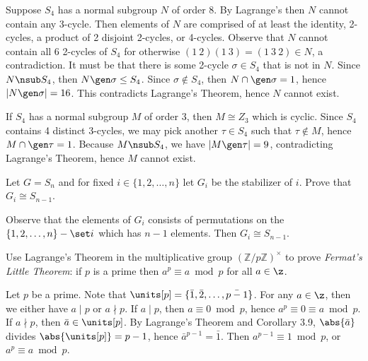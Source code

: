 \begin{sol}
    Suppose $S_4$ has a normal subgroup $N$ of order 8. By Lagrange's then $N$ cannot contain any 3-cycle. Then elements of $N$ are comprised of at least the identity, 2-cycles, a product of 2 disjoint 2-cycles, or 4-cycles. Observe that $N$ cannot contain all 6 2-cycles of $S_4$ for otherwise $(1\ 2)(1\ 3) = (1\ 3\ 2) \in N$, a contradiction. It must be that there is some 2-cycle $\sigma \in S_4$ that is not in $N$. Since $N \nsub S_4$, then $N \gen\sigma \leq S_4$. Since $\sigma \not\in S_4$, then $N \cap \gen\sigma = 1$, hence $|N \gen\sigma| = 16$. This contradicts Lagrange's Theorem, hence $N$ cannot exist.

    If $S_4$ has a normal subgroup $M$ of order 3, then $M \cong Z_3$ which is cyclic. Since $S_4$ contains 4 distinct 3-cycles, we may pick another $\tau \in S_4$ such that $\tau \not\in M$, hence $M \cap \gen\tau = 1$. Because $M \nsub S_4$, we have $|M \gen\tau| = 9$, contradicting Lagrange's Theorem, hence $M$ cannot exist.
\end{sol}

\begin{exercise}\label{ex3.2.15}
    Let $G = S_n$ and for fixed $i \in \{1, 2, \dots, n\}$ let $G_i$ be the stabilizer of $i$. Prove that $G_i \cong S_{n-1}$.
\end{exercise}

\begin{sol}
    Observe that the elements of $G_i$ consists of permutations on the $\{1, 2, \ldots, n\} - \set i$ which has $n - 1$ elements. Then $G_i \cong S_{n - 1}$.
\end{sol}

\begin{exercise}\label{ex3.2.16}
    Use Lagrange's Theorem in the multiplicative group $(\mathbb{Z}/p\mathbb{Z})^\times$ to prove \emph{Fermat's Little Theorem}: if $p$ is a prime then $a^p \equiv a \bmod p$ for all $a \in \z$.
\end{exercise}

\begin{sol}
    Let $p$ be a prime. Note that $\units[p] = \{\bar 1, \bar 2, \ldots, \bar{p - 1}\}$. For any $a \in \z$, then we either have $a \mid p$ or $a \nmid p$. If $a \mid p$, then $a \equiv 0 \bmod p$, hence $a^p \equiv 0 \equiv a \bmod p$. If $a \nmid p$, then $\bar a \in \units[p]$. By Lagrange's Theorem and Corollary 3.9, $\abs{\bar a}$ divides $\abs{\units[p]} = p - 1$, hence $\bar a^{p - 1} = \bar 1$. Then $a^{p - 1} \equiv 1 \bmod p$, or $a^p \equiv a \bmod p$.
\end{sol}

